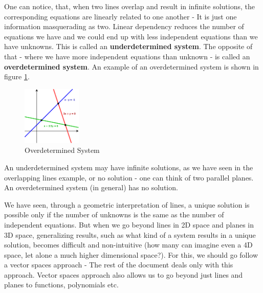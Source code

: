 One can notice, that, when two lines overlap and result in infinite solutions, the corresponding equations are linearly related to one another - It is just one information masquerading as two. Linear dependency reduces the number of equations we have and we could end up with less independent equations than we have unknowns. This is called an \textbf{underdetermined system}. The opposite of that - where we have more independent equations than unknown - is called an \textbf{overdetermined system}. An example of an overdetermined system is shown in figure \ref{fig:overdetermined_system}.
	\begin{figure}[h!]
	\centering
	\includegraphics[width=0.25\textwidth]{Linear_Algebra/overdetermined_system}
	\caption{Overdetermined System}
	\label{fig:overdetermined_system}
	\end{figure}
An underdetermined system may have infinite solutions, as we have seen in the overlapping lines example, or no solution - one can think of two parallel planes. An overdetermined system (in general) has no solution. 

We have seen, through a geometric interpretation of lines, a unique solution is possible only if the number of unknowns is the same as the number of independent equations. But when we go beyond lines in 2D space and planes in 3D space, generalizing results, such as what kind of a system results in a unique solution, becomes difficult and non-intuitive (how many can imagine even a 4D space, let alone a much higher dimensional space?). For this, we should go follow a vector spaces approach - The rest of the document deals only with this approach. Vector spaces approach also allows us to go beyond just lines and planes to functions, polynomials etc. 

